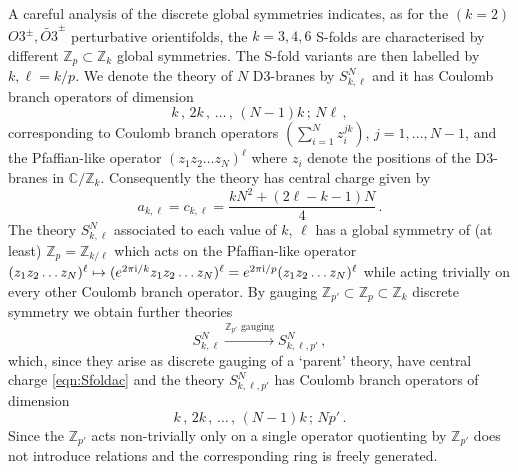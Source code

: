 \documentclass[main.tex]{subfiles}
\begin{document}
A careful analysis \cite{Aharony:2016kai} of the discrete global symmetries indicates, as for the $(k=2)$ $O3^{\pm},\widetilde{O3}^{\pm}$ perturbative orientifolds, the $k=3,4,6$ S-folds are characterised by different $\mathbb{Z}_p\subset\mathbb{Z}_k$ global symmetries. The S-fold variants are then labelled by $k,\ell=k/p$. We denote the theory of $N$ D3-branes by $S^N_{k,\ell}$ and it has Coulomb branch operators of dimension
\begin{equation}
k\,,\,2k\,,\,\dots\,,\,(N-1)k\,;\,N\ell \, ,
\end{equation}
corresponding to Coulomb branch operators $\left(\sum_{i=1}^Nz^{jk}_i\right)$, $j=1,\dots,N-1$, and the Pfaffian-like operator $(z_1z_2\dots z_N)^{\ell}$ where $z_i$ denote the positions of the D3-branes in $\mathbb{C}/\mathbb{Z}_k$. Consequently the theory has central charge given by \cite{Argyres:2007tq,Shapere:2008zf,Aharony:2016kai}
\begin{equation}\label{eqn:Sfoldac}
a_{k,\ell}=c_{k,\ell}=\frac{kN^2+(2\ell-k-1)N}{4}\,.
\end{equation}
The theory $S_{k,\ell}^N$ associated to each value of $k$, $\ell$ has a global symmetry of (at least) $\mathbb{Z}_p=\mathbb{Z}_{k/\ell}$ which acts on the Pfaffian-like operator \newline$(z_1z_2\dots z_N)^{\ell}\mapsto (e^{2\pi\mathrm{i}/k} z_1z_2\dots z_N)^{\ell}=e^{2\pi\mathrm{i}/p}(z_1z_2\dots z_N)^{\ell}$ while acting trivially on every other Coulomb branch operator. By gauging $\mathbb{Z}_{p'}\subset\mathbb{Z}_{p}\subset\mathbb{Z}_k$ discrete symmetry we obtain further theories 
\begin{equation}\label{eqn:sfolddisgauge}
S^N_{k,\ell}\xrightarrow{\text{$\mathbb{Z}_{p'}$ gauging}} S^N_{k,\ell,p'} \, ,
\end{equation} 
which, since they arise as discrete gauging of a `parent' theory, have central charge \eqref{eqn:Sfoldac} and the theory $S^N_{k,\ell,p'}$ has Coulomb branch operators of dimension
\begin{equation}\label{eqn:sfolddiscgauge}
k\,,\,2k\,,\,\dots\,,\,(N-1)k\,;\,Np'\,.
\end{equation}
Since the $\mathbb{Z}_{p'}$ acts non-trivially only on a single operator quotienting by $\mathbb{Z}_{p'}$ does not introduce relations and the corresponding ring is freely generated.
\end{document}
